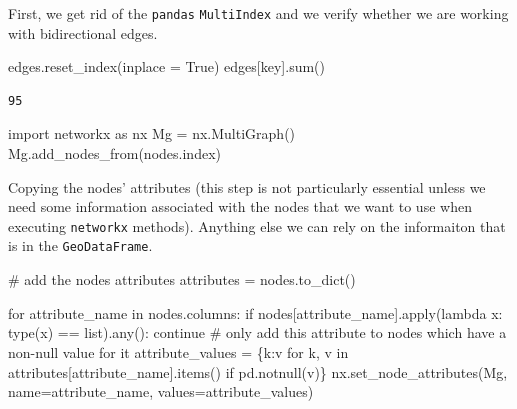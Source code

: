 \documentclass[
  letterpaper,
  DIV=11,
  numbers=noendperiod]{scrreprt}
\newenvironment{Shaded}{\begin{snugshade}}{\end{snugshade}}
\newcommand{\BuiltInTok}[1]{\textcolor[rgb]{0.00,0.23,0.31}{#1}}
\newcommand{\CommentTok}[1]{\textcolor[rgb]{0.37,0.37,0.37}{#1}}
\newcommand{\ControlFlowTok}[1]{\textcolor[rgb]{0.00,0.23,0.31}{#1}}
\newcommand{\ImportTok}[1]{\textcolor[rgb]{0.00,0.46,0.62}{#1}}
\newcommand{\KeywordTok}[1]{\textcolor[rgb]{0.00,0.23,0.31}{#1}}
\newcommand{\NormalTok}[1]{\textcolor[rgb]{0.00,0.23,0.31}{#1}}
\newcommand{\OperatorTok}[1]{\textcolor[rgb]{0.37,0.37,0.37}{#1}}
\newcommand{\StringTok}[1]{\textcolor[rgb]{0.13,0.47,0.30}{#1}}
\newcommand{\VariableTok}[1]{\textcolor[rgb]{0.07,0.07,0.07}{#1}}
\begin{document}
First, we get rid of the \texttt{pandas} \texttt{MultiIndex} and we
verify whether we are working with bidirectional edges.

\begin{Shaded}
\begin{Highlighting}[]
\NormalTok{edges.reset\_index(inplace }\OperatorTok{=} \VariableTok{True}\NormalTok{)}
\NormalTok{edges[}\StringTok{\textquotesingle{}key\textquotesingle{}}\NormalTok{].}\BuiltInTok{sum}\NormalTok{()}
\end{Highlighting}
\end{Shaded}

\begin{verbatim}
95
\end{verbatim}

\begin{Shaded}
\begin{Highlighting}[]
\ImportTok{import}\NormalTok{ networkx }\ImportTok{as}\NormalTok{ nx}
\NormalTok{Mg }\OperatorTok{=}\NormalTok{ nx.MultiGraph()   }
\NormalTok{Mg.add\_nodes\_from(nodes.index)}
\end{Highlighting}
\end{Shaded}

Copying the nodes' attributes (this step is not particularly essential
unless we need some information associated with the nodes that we want
to use when executing \texttt{networkx} methods). Anything else we can
rely on the informaiton that is in the \texttt{GeoDataFrame}.

\begin{Shaded}
\begin{Highlighting}[]
\CommentTok{\# add the nodes\textquotesingle{} attributes}
\NormalTok{attributes }\OperatorTok{=}\NormalTok{ nodes.to\_dict()}

\ControlFlowTok{for}\NormalTok{ attribute\_name }\KeywordTok{in}\NormalTok{ nodes.columns:}
    \ControlFlowTok{if}\NormalTok{ nodes[attribute\_name].}\BuiltInTok{apply}\NormalTok{(}\KeywordTok{lambda}\NormalTok{ x: }\BuiltInTok{type}\NormalTok{(x) }\OperatorTok{==} \BuiltInTok{list}\NormalTok{).}\BuiltInTok{any}\NormalTok{(): }
        \ControlFlowTok{continue} 
    \CommentTok{\# only add this attribute to nodes which have a non{-}null value for it}
\NormalTok{    attribute\_values }\OperatorTok{=}\NormalTok{ \{k:v }\ControlFlowTok{for}\NormalTok{ k, v }\KeywordTok{in}\NormalTok{ attributes[attribute\_name].items() }\ControlFlowTok{if}\NormalTok{ pd.notnull(v)\}}
\NormalTok{    nx.set\_node\_attributes(Mg, name}\OperatorTok{=}\NormalTok{attribute\_name, values}\OperatorTok{=}\NormalTok{attribute\_values)}
\end{Highlighting}
\end{Shaded}
\end{document}
